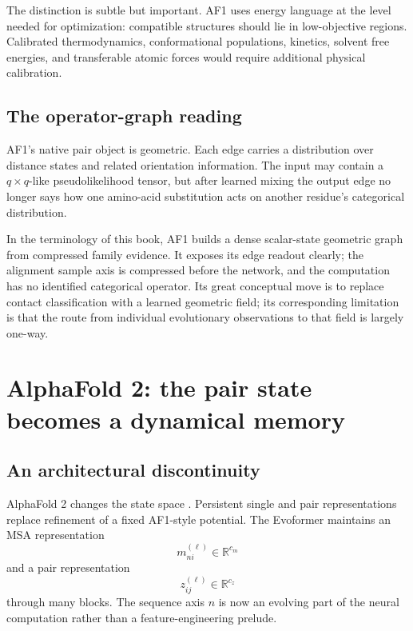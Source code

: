 The distinction is subtle but important.  AF1 uses energy language at the level needed for
optimization: compatible structures should lie in low-objective regions.  Calibrated
thermodynamics, conformational populations, kinetics, solvent free energies, and transferable
atomic forces would require additional physical calibration.

\subsection{The operator-graph reading}

AF1's native pair object is geometric.  Each edge carries a distribution
over distance states and related orientation information.  The input may contain a
$q\times q$-like pseudolikelihood tensor, but after learned mixing the output edge no longer says
how one amino-acid substitution acts on another residue's categorical distribution.

In the terminology of this book, AF1 builds a dense scalar-state geometric graph from compressed
family evidence.  It exposes its edge readout clearly; the alignment sample axis is compressed
before the network, and the computation has no identified categorical operator.  Its great conceptual move is to replace contact
classification with a learned geometric field; its corresponding limitation is that the route from
individual evolutionary observations to that field is largely one-way.

\section{AlphaFold 2: the pair state becomes a dynamical memory}

\subsection{An architectural discontinuity}

AlphaFold 2 changes the state space \cite{jumper2021}.  Persistent single and pair representations
replace refinement of a fixed AF1-style potential.
The Evoformer maintains an MSA representation
\begin{equation}
m_{ni}^{(\ell)}\in\mathbb R^{c_m}
\end{equation}
and a pair representation
\begin{equation}
z_{ij}^{(\ell)}\in\mathbb R^{c_z}
\end{equation}
through many blocks.  The sequence axis $n$ is now an evolving part of the neural computation rather
than a feature-engineering prelude.


